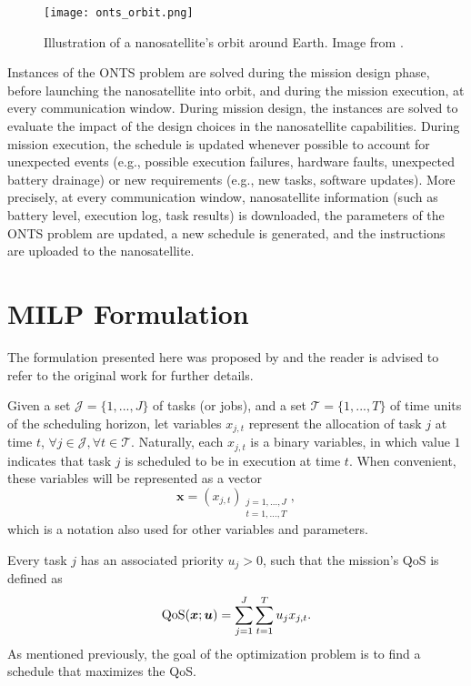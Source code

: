 \begin{figure}[h]
    \centering
    \texttt{[image: onts\_orbit.png]}
    \caption{Illustration of a nanosatellite's orbit around Earth. Image from .}
    \label{fig:onts-orbit}
\end{figure}

Instances of the ONTS problem are solved during the mission design phase, before launching the nanosatellite into orbit, and during the mission execution, at every communication window. 
During mission design, the instances are solved to evaluate the impact of the design choices in the nanosatellite capabilities.
During mission execution, the schedule is updated whenever possible to account for unexpected events (e.g., possible execution failures, hardware faults, unexpected battery drainage) or new requirements (e.g., new tasks, software updates).
More precisely, at every communication window, nanosatellite information (such as battery level, execution log, task results) is downloaded, the parameters of the ONTS problem are updated, a new schedule is generated, and the instructions are uploaded to the nanosatellite.


\section{MILP Formulation}

The formulation presented here was proposed by  and the reader is advised to refer to the original work for further details.

Given a set $\mathcal{J}=\{1,...,J\}$ of tasks (or jobs), and a set $\mathcal{T}=\{1,...,T\}$ of time units of the scheduling horizon, let variables $x_{j,t}$ represent the allocation of task $j$ at time $t$, $\forall j\in \mathcal{J}, \forall t\in \mathcal{T}$.
Naturally, each $x_{j,t}$ is a binary variables, in which value $1$ indicates that task $j$ is scheduled to be in execution at time $t$.
When convenient, these variables will be represented as a vector \[
    \bm{x} = \left( x_{j,t} \right)_{\substack{j=1,\ldots,J\\ t=1,\ldots,T}}
,\] which is a notation also used for other variables and parameters.

Every task $j$ has an associated priority $u_j > 0$, such that the mission's QoS is defined as
\begin{equation}\label{eq:qos}
    {\rm QoS}(\bm{x};\bm{u}) = \sum_{j=1}^{J} \sum_{t=1}^{T} {u}_{j} x_{j,t}
.\end{equation}
As mentioned previously, the goal of the optimization problem is to find a schedule that maximizes the QoS.

